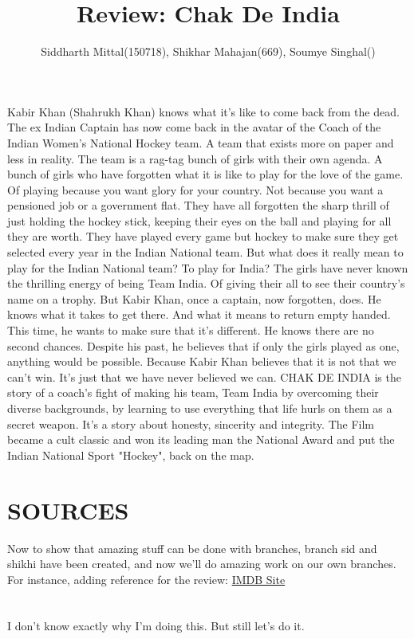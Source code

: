 \documentclass[titlepage]{article}
\title{Review: Chak De India}
\author{Siddharth Mittal(150718), Shikhar Mahajan(669), Soumye Singhal()}
\begin{document}
\maketitle

\section*{}
Kabir Khan (Shahrukh Khan) knows what it's like to come back from the dead. The ex Indian Captain has now come back in the avatar of the Coach of the Indian Women's National Hockey team. A team that exists more on paper and less in reality. The team is a rag-tag bunch of girls with their own agenda. A bunch of girls who have forgotten what it is like to play for the love of the game. Of playing because you want glory for your country. Not because you want a pensioned job or a government flat. They have all forgotten the sharp thrill of just holding the hockey stick, keeping their eyes on the ball and playing for all they are worth. They have played every game but hockey to make sure they get selected every year in the Indian National team. But what does it really mean to play for the Indian National team? To play for India? The girls have never known the thrilling energy of being Team India. Of giving their all to see their country's name on a trophy. But Kabir Khan, once a captain, now forgotten, does. He knows what it takes to get there. And what it means to return empty handed. This time, he wants to make sure that it's different. He knows there are no second chances. Despite his past, he believes that if only the girls played as one, anything would be possible. Because Kabir Khan believes that it is not that we can't win. It's just that we have never believed we can. CHAK DE INDIA is the story of a coach's fight of making his team, Team India by overcoming their diverse backgrounds, by learning to use everything that life hurls on them as a secret weapon. It's a story about honesty, sincerity and integrity. The Film became a cult classic and won its leading man the National Award and put the Indian National Sport "Hockey", back on the map.

\section*{SOURCES}
Now to show that amazing stuff can be done with branches, branch sid and shikhi have been created, and now we'll do amazing work on our own branches.
For instance, adding reference for the review: \href{http://www.imdb.com/title/tt0871510/plotsummary}{IMDB Site}

\section*{}
I don't know exactly why I'm doing this. But still let's do it.
\end{document}
